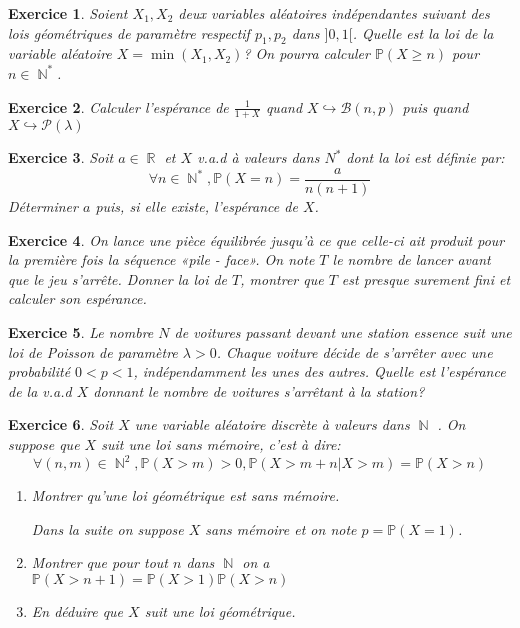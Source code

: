 \documentclass[12pt,a4paper,landscape]{article}
\DeclareMathOperator{\R}{\mathbb{R}}
\DeclareMathOperator{\N}{\mathbb{N}}
\newtheorem{Exo}{Exercice}
\renewcommand{\Pr}{\mathbb{P}}
\begin{document}
\begin{Exo}
	Soient $X_1,X_2$ deux variables aléatoires indépendantes suivant des  lois géométriques de paramètre respectif $p_1,p_2$ dans $]0,1[$. Quelle est la loi de la variable aléatoire $X=\min(X_1,X_2)$? On pourra calculer $\Pr(X\geqslant n)$ pour $n\in\N^*$.
\end{Exo}


\begin{Exo}
	 Calculer l’espérance de $\frac{1}{1+X}$ quand 	$X\hookrightarrow \mathcal{B}(n,p)$ puis quand $X\hookrightarrow \mathcal{P}(\lambda)$
\end{Exo}
 


\begin{Exo}
	 Soit $a\in\R$ et $X$ v.a.d à valeurs dans $N^*$ dont la loi
est définie par:
\[\forall n\in\N^*,\Pr(X=n)=\frac{a}{n(n+1)}\]
Déterminer $a$ puis, si elle existe, l'espérance de $X$.
\end{Exo}


\begin{Exo}
	 On lance une pièce équilibrée jusqu’à ce que celle-ci ait produit pour
la première fois la séquence «pile - face». On note $T$ le nombre de lancer avant que le jeu s’arrête. Donner la loi de $T$, montrer que $T$ est presque surement fini et calculer son espérance.

\end{Exo}

\begin{Exo}
	Le nombre $N$ de voitures passant devant une station essence suit une loi de Poisson de paramètre $\lambda>0$. Chaque voiture décide de s'arrêter avec une probabilité $0<p<1$, indépendamment les unes des autres. Quelle est l'espérance de la v.a.d $X$ donnant le nombre de voitures s'arrêtant à la station?
\end{Exo}


\begin{Exo}
	Soit $X$ une variable aléatoire discrète à valeurs dans $\N$ . On suppose que $X$ suit une loi sans mémoire, c’est à dire:
$$\forall (n,m)\in \N^2,\Pr(X>m)>0,\Pr\left(X>m+n|X>m\right)=\Pr(X>n)$$
\begin{enumerate}
	\item Montrer qu’une loi géométrique est sans mémoire.
	
	Dans la suite on suppose $X$ sans mémoire et on note $p=\Pr(X=1)$.

	\item Montrer que pour tout $n$ dans $\N$ on a $\Pr(X>n+1)=\Pr(X>1)\Pr(X>n)$
	\item En déduire que $X$ suit une loi géométrique.
\end{enumerate}
\end{Exo}
\end{document}
